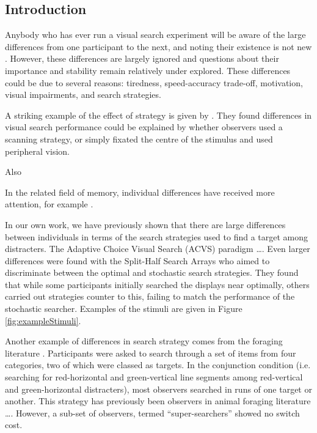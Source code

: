 \documentclass[]{rsos}%
\begin{document}
\begin{fmtext}
\section{Introduction}
Anybody who has ever run a visual search experiment will be aware of the large differences from one participant to the next, and noting their existence is not new \cite{mackworth1948}. However, these differences are largely ignored and questions about their importance and stability remain relatively under explored. These differences could be due to several reasons: tiredness\cite{mackworth1948}, speed-accuracy trade-off, motivation, visual impairments, and search strategies\cite{boot2006}. 

A striking example of the effect of strategy is given by \cite{boot2006, boot2009}. They found differences in visual search performance could be explained by whether observers used a scanning strategy, or simply fixated the centre of the stimulus and used peripheral vision. 

Also \cite{proulx2011}

In the related field of memory, individual differences have received more attention, for example \cite{sobel2007}.


In our own work, we have previously shown that there are large differences between individuals in terms of the search strategies used to find a target among distracters. The Adaptive Choice Visual Search (ACVS) paradigm  \cite{irons-leber2016} \ldots. Even larger differences were found with the Split-Half Search Arrays \cite{nowakowsak2017} who aimed to discriminate between the optimal  \cite{najemnik-geisler2008} and stochastic \cite{clarke2016} search strategies. They found that while some participants initially searched the displays near optimally, others carried out strategies counter to this, failing to match the performance of the stochastic searcher. Examples of the stimuli are given in Figure \ref{fig:exampleStimuli}. 


\end{fmtext}

\maketitle

Another example of differences in search strategy comes from the foraging literature \cite{kristjansson2014,johannesson2016}. Participants were asked to search through a set of items from four categories, two of which were classed as targets. In the conjunction condition (i.e. searching for red-horizontal and green-vertical line segments among red-vertical and green-horizontal distracters), most observers searched in runs of one target or another. This strategy has previously been observers in animal foraging literature \ldots. However, a sub-set of observers, termed ``super-searchers'' showed no switch cost. 
\end{document}
